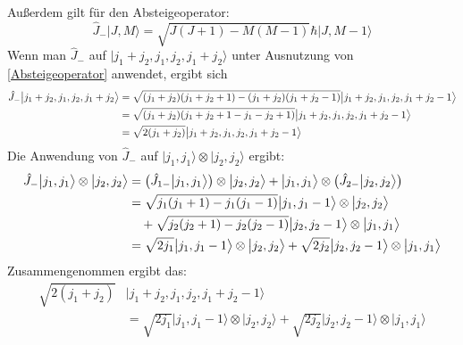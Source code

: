 \documentclass[9pt]{report}
\begin{document}
Außerdem gilt für den Absteigeoperator:
\begin{equation}
\hat{J}_{-}\big|J,M\big\rangle = \sqrt{J(J+1)-M(M-1)}\hbar\big|J,M-1\big\rangle\label{Absteigeoperator}
\end{equation}
Wenn man $\hat{J}_{-}$ auf $\big|j_1+j_2,j_1,j_2,j_1+j_2\big\rangle$ unter Ausnutzung von \eqref{Absteigeoperator} anwendet, ergibt sich
\begin{align}
\hat{J}_{-}\big|j_1+j_2,j_1,j_2,j_1+j_2\big\rangle &= \sqrt{(j_1+j_2)(j_1+j_2+1)-(j_1+j_2)(j_1+j_2-1)}\big|j_1+j_2,j_1,j_2,j_1+j_2-1\big\rangle\notag\\
&= \sqrt{(j_1+j_2)(j_1+j_2+1-j_1-j_2+1)}\big|j_1+j_2,j_1,j_2,j_1+j_2-1\big\rangle\notag\\
&= \sqrt{2(j_1+j_2)}\big|j_1+j_2,j_1,j_2,j_1+j_2-1\big\rangle
\end{align}
Die Anwendung von $\hat{J}_{-}$ auf $\big|j_1,j_1\big\rangle\otimes\big|j_2,j_2\big\rangle$ ergibt:
\begin{align}
\hat{J}_{-}\big|j_1,j_1\big\rangle\otimes\big|j_2,j_2\big\rangle&= \big(\hat{J}_{1-}\big|j_1,j_1\big\rangle\big)\otimes\big|j_2,j_2\big\rangle + \big|j_1,j_1\big\rangle\otimes\big(\hat{J}_{2-}\big|j_2,j_2\big\rangle\big)\\
&= \sqrt{j_1(j_1+1)-j_1(j_1-1)}\big|j_1,j_1-1\big\rangle\otimes\big|j_2,j_2\big\rangle\notag\\
&\quad +\sqrt{j_2(j_2+1)-j_2(j_2-1)}\big|j_2,j_2-1\big\rangle\otimes\big|j_1,j_1\big\rangle\\
&= \sqrt{2j_1}\big|j_1,j_1-1\big\rangle\otimes\big|j_2,j_2\big\rangle+\sqrt{2j_2}\big|j_2,j_2-1\big\rangle\otimes\big|j_1,j_1\big\rangle
\end{align}
Zusammengenommen ergibt das:
\begin{align}
\sqrt{2(j_1+j_2)}&\big|j_1+j_2,j_1,j_2,j_1+j_2-1\big\rangle\\
&=\sqrt{2j_1}\big|j_1,j_1-1\big\rangle\otimes\big|j_2,j_2\big\rangle+\sqrt{2j_2}\big|j_2,j_2-1\big\rangle\otimes\big|j_1,j_1\big\rangle
\end{align}











\newpage
\end{document}
